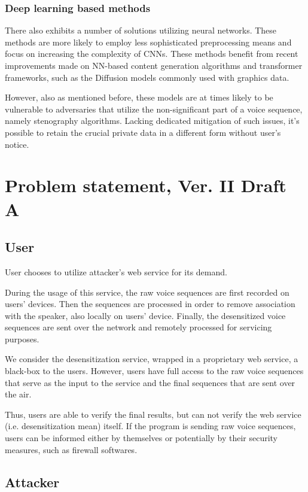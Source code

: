 \documentclass[journal]{IEEEtran} %
\begin{document}
\begin{CJK*}{UTF8}{gbsn}
\subsubsection{Deep learning based methods}

There also exhibits a number of solutions utilizing neural networks. These methods are more likely to employ less sophisticated preprocessing means and focus on increasing the complexity of CNNs. These methods benefit from recent improvements made on NN-based content generation algorithms and transformer frameworks, such as the Diffusion models commonly used with graphics data.\cite{a8}

However, also as mentioned before, these models are at times likely to be vulnerable to adversaries that utilize the non-significant part of a voice sequence, namely stenography algorithms. Lacking dedicated mitigation of such issues, it's possible to retain the crucial private data in a different form without user's notice.

\section{Problem statement, Ver. II Draft A}

\subsection{User}

User chooses to utilize attacker's web service for its demand.

During the usage of this service, the raw voice sequences are first recorded on users' devices. Then the sequences are processed in order to remove association with the speaker, also locally on users' device. Finally, the desensitized voice sequences are sent over the network and remotely processed for servicing purposes.

We consider the desensitization service, wrapped in a proprietary web service, a black-box to the users. However, users have full access to the raw voice sequences that serve as the input to the service and the final sequences that are sent over the air.

Thus, users are able to verify the final results, but can not verify the web service (i.e. desensitization mean) itself. If the program is sending raw voice sequences, users can be informed either by themselves or potentially by their security measures, such as firewall softwares.

\subsection{Attacker}


\end{CJK*}
\end{document}
